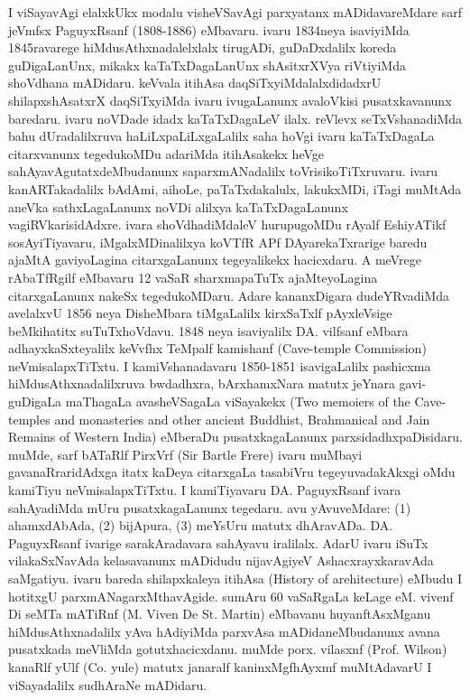 \documentclass[11pt,a4size]{article}
\begin{document}
I viSayavAgi elalxkUkx modalu visheVSavAgi parxyatanx mADidavareMdare
sarf jeVmfsx PaguyxRsanf (1808-1886) eMbavaru. ivaru 1834neya
isaviyiMda 1845ravarege hiMdusAthxnadalelxlalx tirugADi, guDaDxdalilx
koreda guDigaLanUnx, mikakx kaTaTxDagaLanUnx shAsitxrXVya riVtiyiMda
shoVdhana mADidaru. keVvala itihAsa daqSiTxyiMdalalxdidadxrU
shilapxshAsatxrX daqSiTxyiMda ivaru ivugaLanunx avaloVkisi
pusatxkavanunx baredaru. ivaru noVDade idadx kaTaTxDagaLeV
ilalx. reVlevx seTxVshanadiMda bahu dUradalilxruva
haLiLxpaLiLxgaLalilx saha hoVgi ivaru kaTaTxDagaLa citarxvanunx
tegedukoMDu adariMda itihAsakekx heVge sahAyavAgutatxdeMbudanunx
saparxmANadalilx toVrisikoTiTxruvaru. ivaru kanARTakadalilx bAdAmi,
aihoLe, paTaTxdakalulx, lakukxMDi, iTagi muMtAda aneVka
sathxLagaLanunx noVDi alilxya kaTaTxDagaLanunx
vagiRVkarisidAdxre. ivara shoVdhadiMdaleV hurupugoMDu rAyalf
EshiyATikf sosAyiTiyavaru, iMgalxMDinalilxya koVTfR APf
DAyarekaTxrarige baredu ajaMtA gaviyoLagina citarxgaLanunx
tegeyalikekx hacicxdaru. A meVrege rAbaTfRgilf eMbavaru 12 vaSaR
sharxmapaTuTx ajaMteyoLagina citarxgaLanunx nakeSx
tegedukoMDaru. Adare kananxDigara dudeYRvadiMda avelalxvU 1856 neya
DisheMbara tiMgaLalilx kirxSaTxlf pAyxleVsige beMkihatitx
suTuTxhoVdavu. 1848 neya isaviyalilx DA. vilfsanf eMbara
adhayxkaSxteyalilx keVvfhx TeMpalf kamishanf {\rm
    (Cave-temple Commission)} neVmisalapxTiTxtu. I kamiVshanadavaru
1850-1851 isavigaLalilx pashicxma hiMdusAthxnadalilxruva bwdadhxra,
bArxhamxNara matutx jeYnara gavi-guDigaLa maThagaLa avasheVSagaLa
viSayakekx {\rm (Two memoiers of the Cave-temples and
    monasteries and other ancient Buddhist, Brahmanical and Jain
    Remains of Western India)} eMberaDu pusatxkagaLanunx
parxsidadhxpaDisidaru. muMde, sarf bATaRlf PirxVrf
{\rm(Sir Bartle Frere)} ivaru muMbayi gavanaRraridAdxga
itatx kaDeya citarxgaLa tasabiVru tegeyuvadakAkxgi oMdu kamiTiyu
neVmisalapxTiTxtu. I kamiTiyavaru DA. PaguyxRsanf ivara sahAyadiMda
mUru pusatxkagaLanunx tegedaru. avu yAvuveMdare: (1) ahamxdAbAda, (2)
bijApura, (3) meYsUru matutx dhAravADa. DA. PaguyxRsanf ivarige
sarakAradavara sahAyavu iralilalx. AdarU ivaru iSuTx vilakaSxNavAda
kelasavanunx mADidudu nijavAgiyeV AshacxrayxkaravAda saMgatiyu. ivaru
bareda shilapxkaleya itihAsa {\rm (History of
    arehitecture)} eMbudu I hotitxgU parxmANagarxMthavAgide. sumAru
60 vaSaRgaLa keLage eM. vivenf Di seMTa mATiRnf {\rm
    (M. Viven De St. Martin)} eMbavanu huyanftAsxMganu
hiMdusAthxnadalilx yAva hAdiyiMda parxvAsa mADidaneMbudanunx avana
pusatxkada meVliMda gotutxhacicxdanu. muMde porx. vilasxnf
{\rm (Prof. Wilson)} kanaRlf yUlf {\rm
    (Co. yule)} matutx janaralf kaninxMgfhAyxmf muMtAdavarU I
viSayadalilx sudhAraNe mADidaru.
\end{document}
